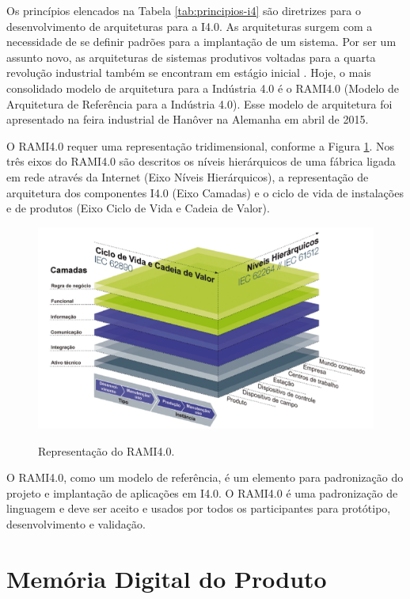 \documentclass[
	12pt,				%
	oneside,			%
	a4paper,			%
	english,			%
	brazil				%
]{abntex2}
\begin{document}
	Os princípios elencados na Tabela \ref{tab:principios-i4} são diretrizes para o desenvolvimento de arquiteturas para a I4.0. As arquiteturas surgem com a necessidade de se definir padrões para a implantação de um sistema. Por ser um assunto novo, as arquiteturas de sistemas produtivos voltadas para a quarta revolução industrial também se encontram em estágio inicial \cite{pisching2018arquitetura}. Hoje, o mais consolidado modelo de arquitetura para a Indústria 4.0 é o RAMI4.0 (Modelo de Arquitetura de Referência para a Indústria 4.0). Esse modelo de arquitetura foi apresentado na feira industrial de Hanôver na Alemanha em abril de 2015.
	
	O RAMI4.0 requer uma representação tridimensional, conforme a Figura \ref{fig:rami4}. Nos três eixos do RAMI4.0 são descritos os níveis hierárquicos de uma fábrica ligada em rede através da Internet (Eixo Níveis Hierárquicos), a representação de arquitetura dos componentes I4.0 (Eixo Camadas) e o ciclo de vida de instalações e de produtos (Eixo Ciclo de Vida e Cadeia de Valor).
	
	\begin{figure}[H]
		\centering
		\caption{Representação do RAMI4.0.}
		\includegraphics[width=1\textwidth]{rami4.png}
		\label{fig:rami4}
	\end{figure}

	O RAMI4.0, como um modelo de referência, é um elemento para padronização do projeto e implantação de aplicações em I4.0. O RAMI4.0 é uma padronização de linguagem e deve ser aceito e usados por todos os participantes para protótipo, desenvolvimento e validação.

\section{Memória Digital do Produto}
\end{document}
